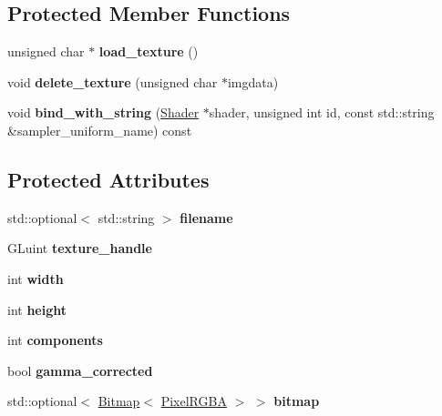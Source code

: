 \subsection*{Protected Member Functions}
\begin{DoxyCompactItemize}
\item 
\mbox{\label{class_texture_a10c263cedc41ebaf472ff5f424a28130}} 
unsigned char $\ast$ {\bfseries load\+\_\+texture} ()
\item 
\mbox{\label{class_texture_a9db7e7ba9d5866d0a58035df47b744e9}} 
void {\bfseries delete\+\_\+texture} (unsigned char $\ast$imgdata)
\item 
\mbox{\label{class_texture_ab57990fdb5f5e053dcff6bea2c5e9f17}} 
void {\bfseries bind\+\_\+with\+\_\+string} (\mbox{\hyperlink{class_shader}{Shader}} $\ast$shader, unsigned int id, const std\+::string \&sampler\+\_\+uniform\+\_\+name) const
\end{DoxyCompactItemize}
\subsection*{Protected Attributes}
\begin{DoxyCompactItemize}
\item 
\mbox{\label{class_texture_ad38f8ae3a9bf46ad60d461c58c53a614}} 
std\+::optional$<$ std\+::string $>$ {\bfseries filename}
\item 
\mbox{\label{class_texture_ae88a57598f85eaffe689b972c6436bcc}} 
G\+Luint {\bfseries texture\+\_\+handle}
\item 
\mbox{\label{class_texture_a06a0246cb31343557c3441c5733349cd}} 
int {\bfseries width}
\item 
\mbox{\label{class_texture_ad37c395c65ff8bde86230908027a6fcd}} 
int {\bfseries height}
\item 
\mbox{\label{class_texture_a59c27456c7b83c7d0f95657195d65c43}} 
int {\bfseries components}
\item 
\mbox{\label{class_texture_af386997e83dd758a3a7a3e2ff163ccbf}} 
bool {\bfseries gamma\+\_\+corrected}
\item 
\mbox{\label{class_texture_ad9e439aa27032a8447b3f75d517784e1}} 
std\+::optional$<$ \mbox{\hyperlink{class_bitmap}{Bitmap}}$<$ \mbox{\hyperlink{class_pixel_r_g_b_a}{Pixel\+R\+G\+BA}} $>$ $>$ {\bfseries bitmap}
\end{DoxyCompactItemize}
